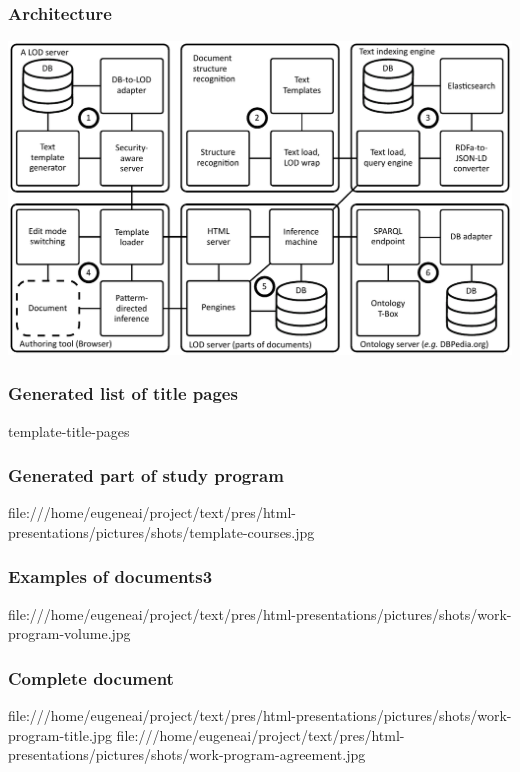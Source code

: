 \documentclass[10pt]{beamer}
\begin{document}
\begin{frame}
  \frametitle{Architecture}
  \begin{center}
  \includegraphics[width=1\linewidth]{architecture-mda-lod-ext.pdf}
  \end{center}
\end{frame}

\begin{frame}
  \frametitle{Generated list of title pages}
  template-title-pages
\end{frame}
\begin{frame}
  \frametitle{Generated part of study program}
  file:///home/eugeneai/project/text/pres/html-presentations/pictures/shots/template-courses.jpg
\end{frame}
\begin{frame}
  \frametitle{Examples of documents3}
file:///home/eugeneai/project/text/pres/html-presentations/pictures/shots/work-program-volume.jpg
\end{frame}

\begin{frame}
  \frametitle{Complete document}
  file:///home/eugeneai/project/text/pres/html-presentations/pictures/shots/work-program-title.jpg
  file:///home/eugeneai/project/text/pres/html-presentations/pictures/shots/work-program-agreement.jpg
\end{frame}
\end{document}
